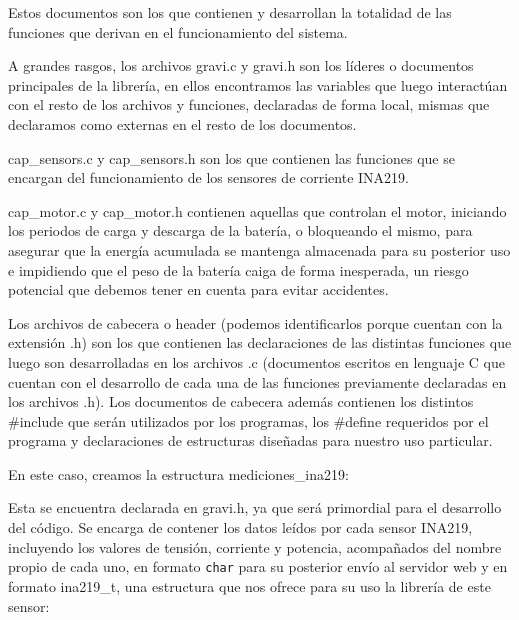                     Estos documentos son los que contienen y desarrollan la totalidad de las funciones que derivan en el funcionamiento del sistema.\par
                    A grandes rasgos, los archivos gravi.c y gravi.h son los líderes o documentos principales de la librería, en ellos encontramos las variables que luego interactúan con el resto de los archivos y funciones, declaradas de forma local, mismas que declaramos como externas en el resto de los documentos.\par
                    cap\_sensors.c y cap\_sensors.h son los que contienen las funciones que se encargan del funcionamiento de los sensores de corriente INA219.\par
                    cap\_motor.c y cap\_motor.h contienen aquellas que controlan el motor, iniciando los periodos de carga y descarga de la batería, o bloqueando el mismo,  para asegurar que la energía acumulada se mantenga almacenada para su posterior uso e impidiendo que el peso de la batería caiga de forma inesperada, un riesgo potencial que debemos tener en cuenta para evitar accidentes.\par
                    Los archivos de cabecera o header (podemos identificarlos porque cuentan con la extensión .h) son los que contienen las declaraciones de las distintas funciones que luego son desarrolladas en los archivos .c (documentos escritos en lenguaje C que cuentan con el desarrollo de cada una de las funciones previamente declaradas en los archivos .h). Los documentos de cabecera además contienen los distintos \#include que serán utilizados por los programas, los \#define requeridos por el programa y declaraciones de estructuras diseñadas para nuestro uso particular.\par
                    En este caso, creamos la estructura mediciones\_ina219:\par
    
                    
                    
                    Esta se encuentra declarada en gravi.h, ya que será primordial para el desarrollo del código. Se encarga de contener los datos leídos por cada sensor INA219, incluyendo los valores de tensión, corriente y potencia, acompañados del nombre propio de cada uno, en formato \texttt{char} para su posterior envío al servidor web y en formato ina219\_t, una estructura que nos ofrece para su uso la librería de este sensor:\par
                    
